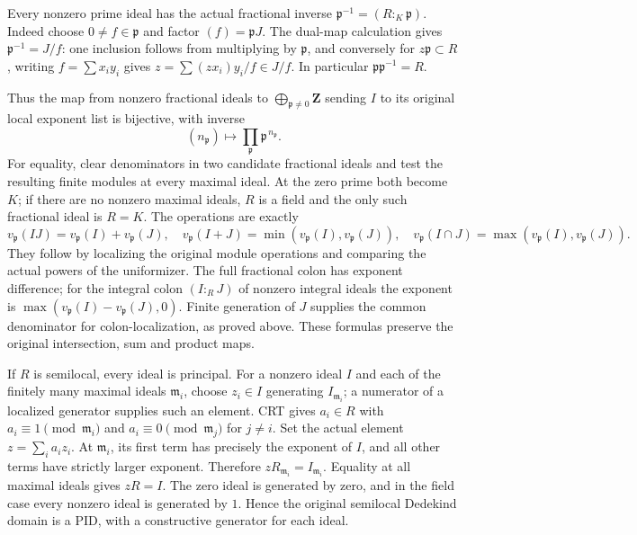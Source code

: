 Every nonzero prime ideal has the actual fractional inverse \(\mathfrak p^{-1}=(R:_K\mathfrak p)\). Indeed choose \(0\ne f\in\mathfrak p\) and factor \((f)=\mathfrak p J\). The dual-map calculation gives \(\mathfrak p^{-1}=J/f\): one inclusion follows from multiplying by \(\mathfrak p\), and conversely for \(z\mathfrak p\subset R\), writing \(f=\sum x_i y_i\) gives \(z=\sum(zx_i)y_i/f\in J/f\). In particular \(\mathfrak p\mathfrak p^{-1}=R\).

Thus the map from nonzero fractional ideals to \(\bigoplus_{\mathfrak p\ne0}\mathbf Z\) sending \(I\) to its original local exponent list is bijective, with inverse \[
 (n_{\mathfrak p})\longmapsto\prod_{\mathfrak p}\mathfrak p^{\,n_{\mathfrak p}}.
\] For equality, clear denominators in two candidate fractional ideals and test the resulting finite modules at every maximal ideal. At the zero prime both become \(K\); if there are no nonzero maximal ideals, \(R\) is a field and the only such fractional ideal is \(R=K\). The operations are exactly \[
 v_{\mathfrak p}(IJ)=v_{\mathfrak p}(I)+v_{\mathfrak p}(J),\quad
 v_{\mathfrak p}(I+J)=\min(v_{\mathfrak p}(I),v_{\mathfrak p}(J)),\quad
 v_{\mathfrak p}(I\cap J)=\max(v_{\mathfrak p}(I),v_{\mathfrak p}(J)).
\] They follow by localizing the original module operations and comparing the actual powers of the uniformizer. The full fractional colon has exponent difference; for the integral colon \((I:_R J)\) of nonzero integral ideals the exponent is \(\max(v_{\mathfrak p}(I)-v_{\mathfrak p}(J),0)\). Finite generation of \(J\) supplies the common denominator for colon-localization, as proved above. These formulas preserve the original intersection, sum and product maps.

If \(R\) is semilocal, every ideal is principal. For a nonzero ideal \(I\) and each of the finitely many maximal ideals \(\mathfrak m_i\), choose \(z_i\in I\) generating \(I_{\mathfrak m_i}\); a numerator of a localized generator supplies such an element. CRT gives \(a_i\in R\) with \(a_i\equiv1\pmod{\mathfrak m_i}\) and \(a_i\equiv0\pmod{\mathfrak m_j}\) for \(j\ne i\). Set the actual element \(z=\sum_i a_i z_i\). At \(\mathfrak m_i\), its first term has precisely the exponent of \(I\), and all other terms have strictly larger exponent. Therefore \(zR_{\mathfrak m_i}=I_{\mathfrak m_i}\). Equality at all maximal ideals gives \(zR=I\). The zero ideal is generated by zero, and in the field case every nonzero ideal is generated by \(1\). Hence the original semilocal Dedekind domain is a PID, with a constructive generator for each ideal.

